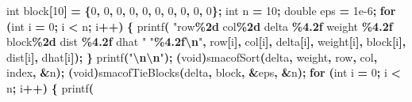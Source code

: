 \documentclass[
  12pt,
]{article}
\newenvironment{Shaded}{\begin{snugshade}}{\end{snugshade}}
\newcommand{\ControlFlowTok}[1]{\textcolor[rgb]{0.13,0.29,0.53}{\textbf{#1}}}
\newcommand{\DataTypeTok}[1]{\textcolor[rgb]{0.13,0.29,0.53}{#1}}
\newcommand{\DecValTok}[1]{\textcolor[rgb]{0.00,0.00,0.81}{#1}}
\newcommand{\FloatTok}[1]{\textcolor[rgb]{0.00,0.00,0.81}{#1}}
\newcommand{\NormalTok}[1]{#1}
\newcommand{\OperatorTok}[1]{\textcolor[rgb]{0.81,0.36,0.00}{\textbf{#1}}}
\newcommand{\SpecialCharTok}[1]{\textcolor[rgb]{0.81,0.36,0.00}{\textbf{#1}}}
\newcommand{\StringTok}[1]{\textcolor[rgb]{0.31,0.60,0.02}{#1}}
\begin{document}
\begin{Shaded}
\begin{Highlighting}[]
    \DataTypeTok{int}\NormalTok{ block}\OperatorTok{[}\DecValTok{10}\OperatorTok{]} \OperatorTok{=} \OperatorTok{\{}\DecValTok{0}\OperatorTok{,} \DecValTok{0}\OperatorTok{,} \DecValTok{0}\OperatorTok{,} \DecValTok{0}\OperatorTok{,} \DecValTok{0}\OperatorTok{,} \DecValTok{0}\OperatorTok{,} \DecValTok{0}\OperatorTok{,} \DecValTok{0}\OperatorTok{,} \DecValTok{0}\OperatorTok{,} \DecValTok{0}\OperatorTok{\};}
    \DataTypeTok{int}\NormalTok{ n }\OperatorTok{=} \DecValTok{10}\OperatorTok{;}
    \DataTypeTok{double}\NormalTok{ eps }\OperatorTok{=} \FloatTok{1e{-}6}\OperatorTok{;}
    \ControlFlowTok{for} \OperatorTok{(}\DataTypeTok{int}\NormalTok{ i }\OperatorTok{=} \DecValTok{0}\OperatorTok{;}\NormalTok{ i }\OperatorTok{\textless{}}\NormalTok{ n}\OperatorTok{;}\NormalTok{ i}\OperatorTok{++)} \OperatorTok{\{}
\NormalTok{        printf}\OperatorTok{(}
            \StringTok{"row}\SpecialCharTok{\%2d}\StringTok{ col}\SpecialCharTok{\%2d}\StringTok{ delta }\SpecialCharTok{\%4.2f}\StringTok{ weight }\SpecialCharTok{\%4.2f}\StringTok{ block}\SpecialCharTok{\%2d}\StringTok{ dist }\SpecialCharTok{\%4.2f}\StringTok{ dhat "}
            \StringTok{"}\SpecialCharTok{\%4.2f\textbackslash{}n}\StringTok{"}\OperatorTok{,}
\NormalTok{            row}\OperatorTok{[}\NormalTok{i}\OperatorTok{],}\NormalTok{ col}\OperatorTok{[}\NormalTok{i}\OperatorTok{],}\NormalTok{ delta}\OperatorTok{[}\NormalTok{i}\OperatorTok{],}\NormalTok{ weight}\OperatorTok{[}\NormalTok{i}\OperatorTok{],}\NormalTok{ block}\OperatorTok{[}\NormalTok{i}\OperatorTok{],}\NormalTok{ dist}\OperatorTok{[}\NormalTok{i}\OperatorTok{],}\NormalTok{ dhat}\OperatorTok{[}\NormalTok{i}\OperatorTok{]);}
    \OperatorTok{\}}
\NormalTok{    printf}\OperatorTok{(}\StringTok{"}\SpecialCharTok{\textbackslash{}n\textbackslash{}n}\StringTok{"}\OperatorTok{);}
    \OperatorTok{(}\DataTypeTok{void}\OperatorTok{)}\NormalTok{smacofSort}\OperatorTok{(}\NormalTok{delta}\OperatorTok{,}\NormalTok{ weight}\OperatorTok{,}\NormalTok{ row}\OperatorTok{,}\NormalTok{ col}\OperatorTok{,}\NormalTok{ index}\OperatorTok{,} \OperatorTok{\&}\NormalTok{n}\OperatorTok{);}
    \OperatorTok{(}\DataTypeTok{void}\OperatorTok{)}\NormalTok{smacofTieBlocks}\OperatorTok{(}\NormalTok{delta}\OperatorTok{,}\NormalTok{ block}\OperatorTok{,} \OperatorTok{\&}\NormalTok{eps}\OperatorTok{,} \OperatorTok{\&}\NormalTok{n}\OperatorTok{);}
    \ControlFlowTok{for} \OperatorTok{(}\DataTypeTok{int}\NormalTok{ i }\OperatorTok{=} \DecValTok{0}\OperatorTok{;}\NormalTok{ i }\OperatorTok{\textless{}}\NormalTok{ n}\OperatorTok{;}\NormalTok{ i}\OperatorTok{++)} \OperatorTok{\{}
\NormalTok{        printf}\OperatorTok{(}

\end{Highlighting}
\end{Shaded}
\end{document}
